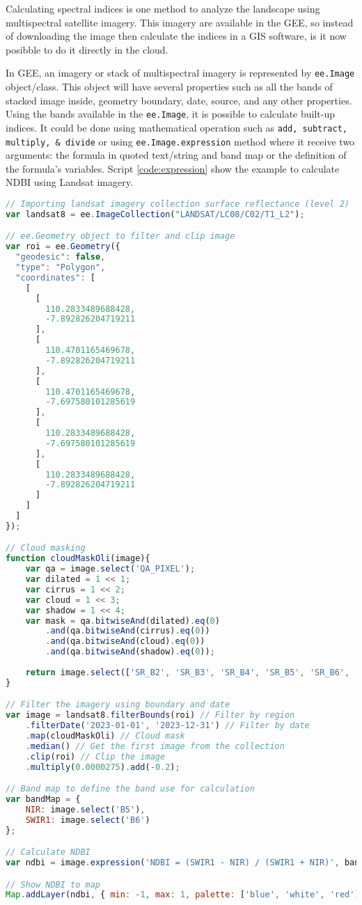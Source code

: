 Calculating spectral indices is one method to analyze the landscape using multispectral satellite imagery. This imagery are available in the GEE, so instead of downloading the image then calculate the indices in a GIS software, is it now posibble to do it directly in the cloud. 

In GEE, an imagery or stack of multispectral imagery is represented by \verb|ee.Image| object/class. This object will have several properties such as all the bands of stacked image inside, geometry boundary, date, source, and any other properties. Using the bands available in the \verb|ee.Image|, it is possible to calculate built-up indices. It could be done using mathematical operation such as \verb|add, subtract, multiply, & divide| or using \verb|ee.Image.expression| method where it receive two arguments: the formula in quoted text/string and band map or the definition of the formula's variables. Script \ref{code:expression} show the example to calculate NDBI using Landsat imagery.

\begin{lstlisting}[language=JavaScript, label={code:expression}, caption={GEE script to calculate NDBI from Landsat 8 OLI imagery}]
// Importing landsat imagery collection surface reflectance (level 2)
var landsat8 = ee.ImageCollection("LANDSAT/LC08/C02/T1_L2");

// ee.Geometry object to filter and clip image
var roi = ee.Geometry({
  "geodesic": false,
  "type": "Polygon",
  "coordinates": [
    [
      [
        110.2833489688428,
        -7.892826204719211
      ],
      [
        110.4701165469678,
        -7.892826204719211
      ],
      [
        110.4701165469678,
        -7.697580101285619
      ],
      [
        110.2833489688428,
        -7.697580101285619
      ],
      [
        110.2833489688428,
        -7.892826204719211
      ]
    ]
  ]
});

// Cloud masking
function cloudMaskOli(image){
	var qa = image.select('QA_PIXEL');
	var dilated = 1 << 1;
	var cirrus = 1 << 2;
	var cloud = 1 << 3;
	var shadow = 1 << 4;
	var mask = qa.bitwiseAnd(dilated).eq(0)
		.and(qa.bitwiseAnd(cirrus).eq(0))
		.and(qa.bitwiseAnd(cloud).eq(0))
		.and(qa.bitwiseAnd(shadow).eq(0));
	
	return image.select(['SR_B2', 'SR_B3', 'SR_B4', 'SR_B5', 'SR_B6', 'SR_B7'], ['B2', 'B3', 'B4', 'B5', 'B6', 'B7']).updateMask(mask);
}

// Filter the imagery using boundary and date
var image = landsat8.filterBounds(roi) // Filter by region
	.filterDate('2023-01-01', '2023-12-31') // Filter by date
	.map(cloudMaskOli) // Cloud mask
	.median() // Get the first image from the collection
	.clip(roi) // Clip the image
	.multiply(0.0000275).add(-0.2);

// Band map to define the band use for calculation
var bandMap = {
	NIR: image.select('B5'),
	SWIR1: image.select('B6')
};

// Calculate NDBI
var ndbi = image.expression('NDBI = (SWIR1 - NIR) / (SWIR1 + NIR)', bandMap);

// Show NDBI to map
Map.addLayer(ndbi, { min: -1, max: 1, palette: ['blue', 'white', 'red'] }, 'NDBI');
\end{lstlisting}

